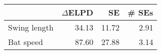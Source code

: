 \begin{tabular}{l|r|r|r|}
                & $\Delta$ELPD  & SE    & \# SEs \\
  \hline
  Swing length  & 34.13         & 11.72 & 2.91 \\ 
  Bat speed     & 87.60         & 27.88 & 3.14
\end{tabular}